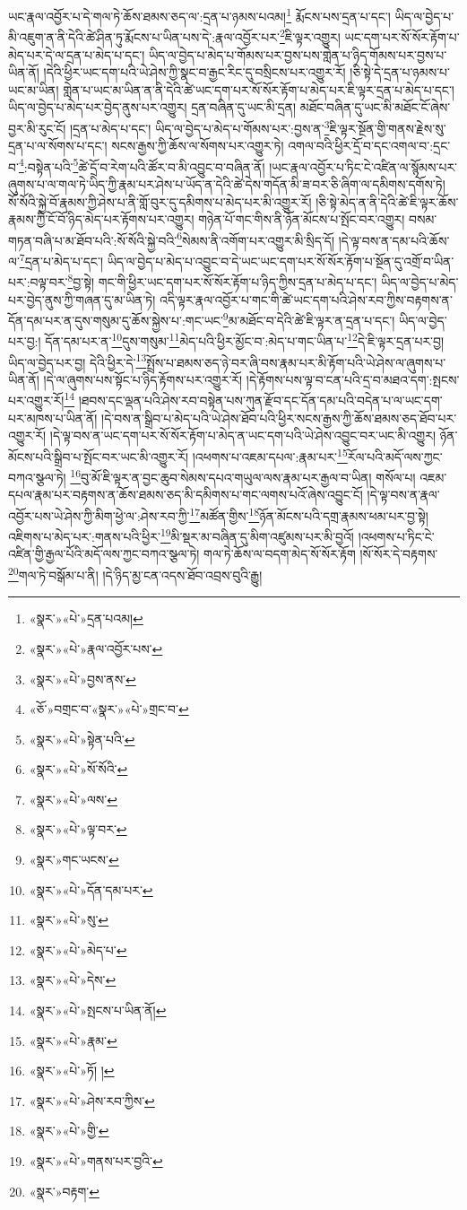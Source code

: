 ཡང་རྣལ་འབྱོར་པ་དེ་གལ་ཏེ་ཆོས་ཐམས་ཅད་ལ་:དྲན་པ་ཉམས་པའམ།\footnote{«སྣར་»«པེ་»དྲན་པའམ།} རྨོངས་པས་དྲན་པ་དང་། ཡིད་ལ་བྱེད་པ་མི་འཇུག་ན་ནི་དེའི་ཚེ་ཤིན་ཏུ་རྨོངས་པ་ཡིན་པས་དེ་:རྣལ་འབྱོར་པར་\footnote{«སྣར་»«པེ་»རྣལ་འབྱོར་པས་}ཇི་ལྟར་འགྱུར། ཡང་དག་པར་སོ་སོར་རྟོག་པ་མེད་པར་དེ་ལ་དྲན་པ་མེད་པ་དང་། ཡིད་ལ་བྱེད་པ་མེད་པ་གོམས་པར་བྱས་པས་གླེན་པ་ཉིད་གོམས་པར་བྱས་པ་ཡིན་ནོ། །དེའི་ཕྱིར་ཡང་དག་པའི་ཡེ་ཤེས་ཀྱི་སྣང་བ་རྒྱང་རིང་དུ་བསྲིངས་པར་འགྱུར་རོ། །ཅི་སྟེ་དེ་དྲན་པ་ཉམས་པ་ཡང་མ་ཡིན། གླེན་པ་ཡང་མ་ཡིན་ན་ནི་དེའི་ཚེ་ཡང་དག་པར་སོ་སོར་རྟོག་པ་མེད་པར་ཇི་ལྟར་དྲན་པ་མེད་པ་དང་། ཡིད་ལ་བྱེད་པ་མེད་པར་བྱེད་ནུས་པར་འགྱུར། དྲན་བཞིན་དུ་ཡང་མི་དྲན། མཐོང་བཞིན་དུ་ཡང་མི་མཐོང་ངོ་ཞེས་བྱར་མི་རུང་ངོ། །དྲན་པ་མེད་པ་དང་། ཡིད་ལ་བྱེད་པ་མེད་པ་གོམས་པར་:བྱས་ན་\footnote{«སྣར་»«པེ་»བྱས་ནས་}ཇི་ལྟར་སྔོན་གྱི་གནས་རྗེས་སུ་དྲན་པ་ལ་སོགས་པ་དང་། སངས་རྒྱས་ཀྱི་ཆོས་ལ་སོགས་པར་འགྱུར་ཏེ། འགལ་བའི་ཕྱིར་དྲོ་བ་དང་འགལ་བ་:དྲང་བ་\footnote{«ཅོ་»བགྲང་བ་«སྣར་»«པེ་»གྲང་བ་}:བསྟེན་པའི་\footnote{«སྣར་»«པེ་»སྟེན་པའི་}ཚེ་དྲོ་བ་རེག་པའི་ཚོར་བ་མི་འབྱུང་བ་བཞིན་ནོ། །ཡང་རྣལ་འབྱོར་པ་ཏིང་ངེ་འཛིན་ལ་སྙོམས་པར་ཞུགས་པ་ལ་གལ་ཏེ་ཡིད་ཀྱི་རྣམ་པར་ཤེས་པ་ཡོད་ན་དེའི་ཚེ་དེས་གདོན་མི་ཟ་བར་ཅི་ཞིག་ལ་དམིགས་དགོས་ཏེ། སོ་སོའི་སྐྱེ་བོ་རྣམས་ཀྱི་ཤེས་པ་ནི་གློ་བུར་དུ་དམིགས་པ་མེད་པར་མི་འགྱུར་རོ། །ཅི་སྟེ་མེད་ན་ནི་དེའི་ཚེ་ཇི་ལྟར་ཆོས་རྣམས་ཀྱི་ངོ་བོ་ཉིད་མེད་པར་རྟོགས་པར་འགྱུར། གཉེན་པོ་གང་གིས་ནི་ཉོན་མོངས་པ་སྤོང་བར་འགྱུར། བསམ་གཏན་བཞི་པ་མ་ཐོབ་པའི་:སོ་སོའི་སྐྱེ་བའི་\footnote{«སྣར་»«པེ་»སོ་སོའི་}སེམས་ནི་འགོག་པར་འགྱུར་མི་སྲིད་དོ། །དེ་ལྟ་བས་ན་དམ་པའི་ཆོས་ལ་\footnote{«སྣར་»«པེ་»ལས་}དྲན་པ་མེད་པ་དང་། ཡིད་ལ་བྱེད་པ་མེད་པ་འབྱུང་བ་དེ་ཡང་ཡང་དག་པར་སོ་སོར་རྟོག་པ་སྔོན་དུ་འགྲོ་བ་ཡིན་པར་:བལྟ་བར་\footnote{«སྣར་»«པེ་»ལྟ་བར་}བྱ་སྟེ། གང་གི་ཕྱིར་ཡང་དག་པར་སོ་སོར་རྟོག་པ་ཉིད་ཀྱིས་དྲན་པ་མེད་པ་དང་། ཡིད་ལ་བྱེད་པ་མེད་པར་བྱེད་ནུས་ཀྱི་གཞན་དུ་མ་ཡིན་ཏེ། འདི་ལྟར་རྣལ་འབྱོར་པ་གང་གི་ཚེ་ཡང་དག་པའི་ཤེས་རབ་ཀྱིས་བརྟགས་ན་དོན་དམ་པར་ན་དུས་གསུམ་དུ་ཆོས་སྐྱེས་པ་:གང་ཡང་\footnote{«སྣར་»གང་ཡངས་}མ་མཐོང་བ་དེའི་ཚེ་ཇི་ལྟར་ན་དྲན་པ་དང་། ཡིད་ལ་བྱེད་པར་བྱ:། དོན་དམ་པར་ན་\footnote{«སྣར་»«པེ་»དོན་དམ་པར་}དུས་གསུམ་\footnote{«སྣར་»«པེ་»སུ་}མེད་པའི་ཕྱིར་མྱོང་བ་:མེད་པ་གང་ཡིན་པ་\footnote{«སྣར་»«པེ་»མེད་པ་}དེ་ཇི་ལྟར་དྲན་པར་བྱ། ཡིད་ལ་བྱེད་པར་བྱ། དེའི་ཕྱིར་དེ་\footnote{«སྣར་»«པེ་»དེས་}སྤྲོས་པ་ཐམས་ཅད་ཉེ་བར་ཞི་བས་རྣམ་པར་མི་རྟོག་པའི་ཡེ་ཤེས་ལ་ཞུགས་པ་ཡིན་ནོ། །དེ་ལ་ཞུགས་པས་སྟོང་པ་ཉིད་རྟོགས་པར་འགྱུར་རོ། །དེ་རྟོགས་པས་ལྟ་བ་ངན་པའི་དྲ་བ་མཐའ་དག་:སྤངས་པར་འགྱུར་རོ།\footnote{«སྣར་»«པེ་»སྤངས་པ་ཡིན་ནོ།} །ཐབས་དང་ལྡན་པའི་ཤེས་རབ་བསྟེན་པས་ཀུན་རྫོབ་དང་དོན་དམ་པའི་བདེན་པ་ལ་ཡང་དག་པར་མཁས་པ་ཡིན་ནོ། །དེ་བས་ན་སྒྲིབ་པ་མེད་པའི་ཡེ་ཤེས་ཐོབ་པའི་ཕྱིར་སངས་རྒྱས་ཀྱི་ཆོས་ཐམས་ཅད་ཐོབ་པར་འགྱུར་རོ། །དེ་ལྟ་བས་ན་ཡང་དག་པར་སོ་སོར་རྟོག་པ་མེད་ན་ཡང་དག་པའི་ཡེ་ཤེས་འབྱུང་བར་ཡང་མི་འགྱུར། ཉོན་མོངས་པའི་སྒྲིབ་པ་སྤོང་བར་ཡང་མི་འགྱུར་རོ། །འཕགས་པ་འཇམ་དཔལ་:རྣམ་པར་\footnote{«སྣར་»«པེ་»རྣམ་}རོལ་པའི་མདོ་ལས་ཀྱང་བཀའ་སྩལ་ཏེ། \footnote{«སྣར་»«པེ་»ཏོ། ། }བུ་མོ་ཇི་ལྟར་ན་བྱང་ཆུབ་སེམས་དཔའ་གཡུལ་ལས་རྣམ་པར་རྒྱལ་བ་ཡིན། གསོལ་པ། འཇམ་དཔལ་རྣམ་པར་བརྟགས་ན་ཆོས་ཐམས་ཅད་མི་དམིགས་པ་གང་ལགས་པའོ་ཞེས་འབྱུང་ངོ། །དེ་ལྟ་བས་ན་རྣལ་འབྱོར་པས་ཡེ་ཤེས་ཀྱི་མིག་ཕྱེ་ལ་:ཤེས་རབ་ཀྱི་\footnote{«སྣར་»«པེ་»ཤེས་རབ་ཀྱིས་}མཚོན་གྱིས་\footnote{«སྣར་»«པེ་»གྱི་}ཉོན་མོངས་པའི་དགྲ་རྣམས་ཕམ་པར་བྱ་སྟེ། འཇིགས་པ་མེད་པར་:གནས་པའི་ཕྱིར་\footnote{«སྣར་»«པེ་»གནས་པར་བྱའི་}མི་སྡར་མ་བཞིན་དུ་མིག་འཛུམས་པར་མི་བྱའོ། །འཕགས་པ་ཏིང་ངེ་འཛིན་གྱི་རྒྱལ་པོའི་མདོ་ལས་ཀྱང་བཀའ་སྩལ་ཏེ། གལ་ཏེ་ཆོས་ལ་བདག་མེད་སོ་སོར་རྟོག །སོ་སོར་དེ་བརྟགས་\footnote{«སྣར་»བརྟག་}གལ་ཏེ་བསྒོམ་པ་ནི། །དེ་ཉིད་མྱ་ངན་འདས་ཐོབ་འབྲས་བུའི་རྒྱུ། 
